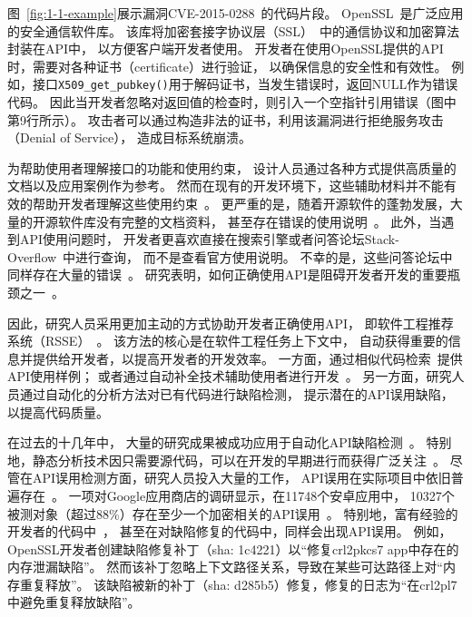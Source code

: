 图~\ref{fig:1-1-example}展示漏洞CVE-2015-0288~\cite{CVE-2015-0288}的代码片段。
OpenSSL~\cite{openssl}是广泛应用的安全通信软件库。
该库将加密套接字协议层（SSL）~\cite{ssl}中的通信协议和加密算法封装在API中，
以方便客户端开发者使用。
开发者在使用OpenSSL提供的API时，需要对各种证书（certificate）进行验证，
以确保信息的安全性和有效性。
例如，接口\texttt{X509\_get\_pubkey()}用于解码证书，当发生错误时，返回NULL作为错误代码。
因此当开发者忽略对返回值的检查时，则引入一个空指针引用错误（图中第9行所示）。
攻击者可以通过构造非法的证书，利用该漏洞进行拒绝服务攻击（Denial of Service），
造成目标系统崩溃。







为帮助使用者理解接口的功能和使用约束，
设计人员通过各种方式提供高质量的文档以及应用案例作为参考。
然而在现有的开发环境下，这些辅助材料并不能有效的帮助开发者理解这些使用约束~\cite{09-icse-doc}。
更严重的是，随着开源软件的蓬勃发展，大量的开源软件库没有完整的文档资料，
甚至存在错误的使用说明~\cite{15-ieee-doc-fail, 17-icse-api-doc}。
此外，当遇到API使用问题时，
开发者更喜欢直接在搜索引擎或者问答论坛Stack-Overflow~\cite{stackoverflow}中进行查询，
而不是查看官方使用说明。
不幸的是，这些问答论坛中同样存在大量的错误~\cite{16-sp-stack}。
研究表明，如何正确使用API是阻碍开发者开发的重要瓶颈之一~\cite{16-icse-cry}。


因此，研究人员采用更加主动的方式协助开发者正确使用API，
即软件工程推荐系统（RSSE）~\cite{10-ieee-rsse}。
该方法的核心是在软件工程任务上下文中，
自动获得重要的信息并提供给开发者，以提高开发者的开发效率。
一方面，通过相似代码检索~\cite{05-icse-rec,16-icse-doc-stack,14-msr-stack}提供API使用样例；
或者通过自动补全技术辅助使用者进行开发~\cite{15-tosem-code-cplt}。
另一方面，研究人员通过自动化的分析方法对已有代码进行缺陷检测，
提示潜在的API误用缺陷，以提高代码质量。


在过去的十几年中，
大量的研究成果被成功应用于自动化API缺陷检测~\cite{15-coufless-static-survey,18-icse-saful,survey18}。
特别地，静态分析技术因只需要源代码，可以在开发的早期进行而获得广泛关注~\cite{05-icse-static}。
尽管在API误用检测方面，研究人员投入大量的工作，
API误用在实际项目中依旧普遍存在~\cite{16-ase-spec, 18-icse-stack}。
一项对Google应用商店的调研显示，在11748个安卓应用中，
10327个被测对象（超过88\%）存在至少一个加密相关的API误用~\cite{13-ccs-misuse}。
特别地，富有经验的开发者的代码中~\cite{18-soups-api-blind}，
甚至在对缺陷修复的代码中，同样会出现API误用。
例如，OpenSSL开发者创建缺陷修复补丁（sha: 1c4221）以``修复crl2pkcs7 app中存在的内存泄漏缺陷''。
然而该补丁忽略上下文路径关系，导致在某些可达路径上对``内存重复释放''。
该缺陷被新的补丁（sha: d285b5）修复，修复的日志为``在crl2pl7中避免重复释放缺陷''。


